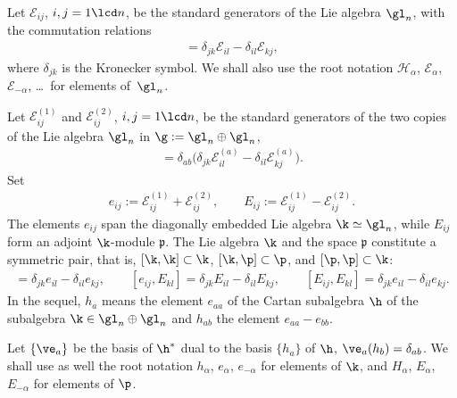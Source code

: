 \documentclass[11pt]{article}
\numberwithin{equation}{section}
\begin{document}
Let ${\mathcal{E}}_{ij}$, $i,j=1\lcd n$, be the standard generators of the Lie algebra $\gl_n$, with the commutation relations
\begin{gather*}
[{\mathcal{E}}_{ij},{\mathcal{E}}_{kl}]=\delta_{jk}{\mathcal{E}}_{il}-\delta_{il}{\mathcal{E}}_{kj} ,
\end{gather*}
where $\delta_{jk}$ is the Kronecker symbol. We shall also use the root notation ${\mathcal{H}}_\alpha$, ${\mathcal{E}}_{\alpha}$, ${\mathcal{E}}_{-\alpha}$, \dots\ for elements of~$\gl_n$.


Let ${\mathcal{E}}_{ij}^{(1)}$ and ${\mathcal{E}}_{ij}^{(2)}$, $i,j=1\lcd n$, be the standard generators of the two copies of the Lie algebra $\gl_n$ in $\g:=\gl_n\oplus\gl_n$,
\begin{gather*}
[{\mathcal{E}}_{ij}^{(a)},{\mathcal{E}}_{kl}^{(b)}]=\delta_{ab}\big(\delta_{jk}{\mathcal{E}}_{il}^{(a)}-\delta_{il}{\mathcal{E}}_{kj}^{(a)}\big) .\end{gather*}
Set
\begin{gather*}
 e_{ij}:={\mathcal{E}}_{ij}^{(1)}+{\mathcal{E}}_{ij}^{(2)} ,\qquad E_{ij}:={\mathcal{E}}_{ij}^{(1)}-{\mathcal{E}}_{ij}^{(2)}
 .
 \end{gather*}
The elements $e_{ij}$ span the diagonally embedded Lie algebra $\k\simeq\gl_n$, while $E_{ij}$ form an adjoint $\k$-module $\mathfrak{p}$. The
Lie algebra $\k$ and the space $\mathfrak{p}$ constitute a symmetric pair, that is, $[\k,\k]\subset \k$, $[\k,\p]\subset \p$, and $[\p,\p]\subset \k$:
\begin{gather*}
 [e_{ij},e_{kl}] = \delta_{jk}e_{il}-\delta_{il}e_{kj}  ,\qquad
  [e_{ij},E_{kl}] = \delta_{jk}E_{il}-\delta_{il}E_{kj}  ,\qquad
   [E_{ij},E_{kl}] = \delta_{jk}e_{il}-\delta_{il}e_{kj} .
\end{gather*}
In the sequel, $h_a$ means the element $e_{aa}$ of the Cartan subalgebra $\h$ of the subalgebra $\k\in\gl_n\oplus\gl_n$ and $h_{ab}$ the
element $e_{aa}-e_{bb}$.


Let $\{\ve_a\}$ be the basis of $\h^*$ dual to the basis $\{ h_a\}$ of $\h$, $\ve_a(h_b)=\delta_{ab}$. We shall use as well the root notation $h_\alpha$,
$e_{\alpha}$, $e_{-\alpha}$ for elements of $\k$, and $H_\alpha$, $E_{\alpha}$, $E_{-\alpha}$ for elements of $\p$.
\end{document}
